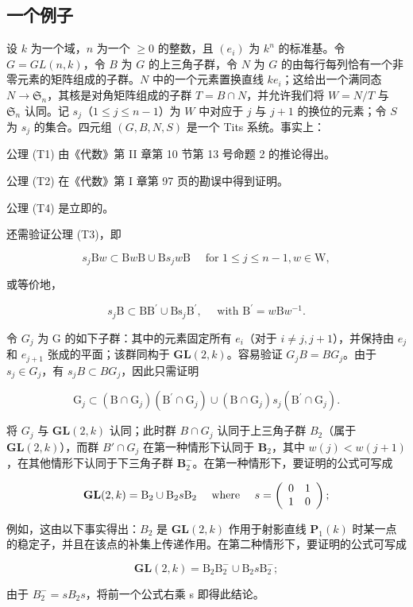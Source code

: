 \subsection{一个例子}

设 \(k\) 为一个域，\(n\) 为一个 \(\geqslant 0\) 的整数，且 \((e_i)\) 为 \(k^n\) 的标准基。令 \(G = GL(n, k)\)，令 \(B\) 为 \(G\) 的上三角子群，令 \(N\) 为 \(G\) 的由每行每列恰有一个非零元素的矩阵组成的子群。\(N\) 中的一个元素置换直线 \(ke_i\)；这给出一个满同态 \(N \to \mathfrak{S}_n\)，其核是对角矩阵组成的子群 \(T = B \cap N\)，并允许我们将 \(W = N/T\) 与 \(\mathfrak{S}_n\) 认同。记 \(s_j\)（\(1 \leqslant j \leqslant n - 1\)）为 \(W\) 中对应于 \(j\) 与 \(j + 1\) 的换位的元素；令 \(S\) 为 \(s_j\) 的集合。四元组 \((G, B, N, S)\) 是一个 Tits 系统。事实上：

公理 (T1) 由《代数》第 II 章第 10 节第 13 号命题 2 的推论得出。

公理 (T2) 在《代数》第 I 章第 97 页的勘误中得到证明。

公理 (T4) 是立即的。

还需验证公理 (T3)，即

\[
s _ {j} \mathrm{B} w \subset \mathrm{B} w \mathrm{B} \cup \mathrm{B} s _ {j} w \mathrm{B} \quad \text { for } 1 \leqslant j \leqslant n - 1, w \in \mathrm{W},
\]

或等价地，

\[
s _ {j} \mathrm{B} \subset \mathrm{BB} ^ {\prime} \cup \mathrm{Bs} _ {j} \mathrm{B} ^ {\prime}, \quad \text { with } \mathrm{B} ^ {\prime} = w \mathrm{B} w ^ {- 1}.
\]

令 \(G_{j}\) 为 G 的如下子群：其中的元素固定所有 \(e_{i}\)（对于 \(i \neq j, j + 1\)），并保持由 \(e_{j}\) 和 \(e_{j+1}\) 张成的平面；该群同构于 \(\mathbf{GL}(2, k)\)。容易验证 \(G_{j}B = BG_{j}\)。由于 \(s_{j} \in G_{j}\)，有 \(s_{j}B \subset BG_{j}\)，因此只需证明

\[
\mathrm{G} _ {j} \subset (\mathrm{B} \cap \mathrm{G} _ {j}) (\mathrm{B} ^ {\prime} \cap \mathrm{G} _ {j}) \cup (\mathrm{B} \cap \mathrm{G} _ {j}) s _ {j} (\mathrm{B} ^ {\prime} \cap \mathrm{G} _ {j}).
\]

将 \(G_{j}\) 与 \(\mathbf{GL}(2,k)\) 认同；此时群 \(B \cap G_{j}\) 认同于上三角子群 \(B_{2}\)（属于 \(\mathbf{GL}(2,k)\)），而群 \(B' \cap G_{j}\) 在第一种情形下认同于 \(\mathbf{B}_2\)，其中 \(w(j) < w(j + 1)\)，在其他情形下认同于下三角子群 \(\mathbf{B}_2^-\)。在第一种情形下，要证明的公式可写成

\[
\mathbf {G L} (2, k) = \mathrm{B} _ {2} \cup \mathrm{B} _ {2} s \mathrm{B} _ {2} \quad \text { where } \quad s = \left( \begin{array}{c c} 0 & 1 \\ 1 & 0 \end{array} \right);
\]

例如，这由以下事实得出：\(B_{2}\) 是 \(\mathbf{GL}(2,k)\) 作用于射影直线 \(\mathbf{P}_{1}(k)\) 时某一点的稳定子，并且在该点的补集上传递作用。在第二种情形下，要证明的公式可写成

\[
\mathbf {G L} (2, k) = \mathrm{B} _ {2} \mathrm{B} _ {2} ^ {-} \cup \mathrm{B} _ {2} s \mathrm{B} _ {2} ^ {-};
\]

由于 \(B_{2}^{-} = sB_{2}s\)，将前一个公式右乘 s 即得此结论。

